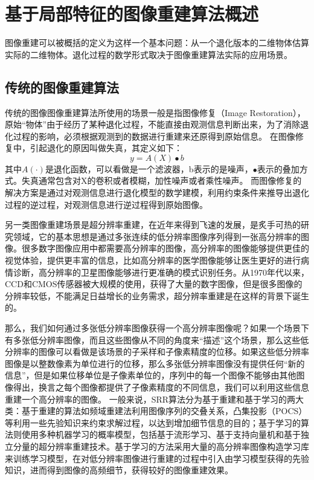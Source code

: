

\chapter{基于局部特征的图像重建算法概述}

图像重建可以被概括的定义为这样一个基本问题：从一个退化版本的二维物体估算实际的二维物体\cite{Demoment:1989tw}。退化过程的数学形式取决于图像重建算法实际的应用场景。

\section{传统的图像重建算法}
传统的图像图像重建算法所使用的场景一般是指图像修复（Image Restoration），原始“物体”由于经历了某种退化过程，不能直接由观测信息判断出来，为了消除退化过程的影响，必须根据观测到的数据进行重建来还原得到原始信息。
在图像修复中，引起退化的原因叫做失真，其定义如下：
\begin{equation}
y = A(X) \bullet b
\end{equation}
其中\(A(\cdot)\)是退化函数，可以看做是一个滤波器，b表示的是噪声，\(\bullet\)表示的叠加方式。失真通常包含对X的卷积或者模糊，加性噪声或者乘性噪声。
而图像修复的解决方案是通过对观测信息进行退化模型的数学建模，利用约束条件来推导出退化过程的逆过程，对观测信息进行逆过程得到原始图像。

另一类图像重建场景是超分辨率重建，在近年来得到飞速的发展，是炙手可热的研究领域，它的基本思想是通过多张连续的低分辨率图像序列得到一张高分辨率的图像。很多数字图像应用中都需要高分辨率的图像，高分辨率的图像能够提供更佳的视觉体验，提供更丰富的信息，比如高分辨率的医学图像能够让医生更好的进行病情诊断，高分辨率的卫星图像能够进行更准确的模式识别任务。从1970年代以来，CCD和CMOS传感器被大规模的使用，获得了大量的数字图像，但是很多图像的分辨率较低，不能满足日益增长的业务需求，超分辨率重建是在这样的背景下诞生的\cite{Park:2003hg}。

那么，我们如何通过多张低分辨率图像获得一个高分辨率图像呢？如果一个场景下有多张低分辨率图像，而且这些图像从不同的角度来“描述”这个场景，那么这些低分辨率的图像可以看做是该场景的子采样和子像素精度的位移。如果这些低分辨率图像是以整数像素为单位进行的位移，那么多张低分辨率图像没有提供任何“新的信息”，但是如果位移单位是子像素单位的，序列中的每一个图像不能够由其他图像得出，换言之每个图像都提供了子像素精度的不同信息，我们可以利用这些信息重建一个高分辨率的图像。
一般来说，SRR算法分为基于重建和基于学习的两大类：基于重建的算法如频域重建法利用图像序列的交叠关系，凸集投影（POCS）等利用一些先验知识来约束求解过程，以达到增加细节信息的目的；基于学习的算法则使用多种机器学习的概率模型，包括基于流形学习、基于支持向量机和基于独立分量的超分辨率重建技术。基于学习的方法采用大量的高分辨率图像构造学习库来训练学习模型，在对低分辨率图像进行重建的过程中引入由学习模型获得的先验知识，进而得到图像的高频细节，获得较好的图像重建效果。

